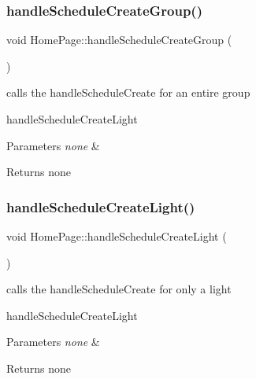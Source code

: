 \subsubsection{\texorpdfstring{handle\+Schedule\+Create\+Group()}{handleScheduleCreateGroup()}}
{\footnotesize\ttfamily void Home\+Page\+::handle\+Schedule\+Create\+Group (\begin{DoxyParamCaption}{ }\end{DoxyParamCaption})\hspace{0.3cm}{\ttfamily [private]}}



calls the handle\+Schedule\+Create for an entire group 

handle\+Schedule\+Create\+Light 
\begin{DoxyParams}{Parameters}
{\em none} & \\
\hline
\end{DoxyParams}
\begin{DoxyReturn}{Returns}
none 
\end{DoxyReturn}
\mbox{\label{class_home_page_a90f36d7359af291e1becf350c7805768}} 
\subsubsection{\texorpdfstring{handle\+Schedule\+Create\+Light()}{handleScheduleCreateLight()}}
{\footnotesize\ttfamily void Home\+Page\+::handle\+Schedule\+Create\+Light (\begin{DoxyParamCaption}{ }\end{DoxyParamCaption})\hspace{0.3cm}{\ttfamily [private]}}



calls the handle\+Schedule\+Create for only a light 

handle\+Schedule\+Create\+Light 
\begin{DoxyParams}{Parameters}
{\em none} & \\
\hline
\end{DoxyParams}
\begin{DoxyReturn}{Returns}
none 
\end{DoxyReturn}
\mbox{\label{class_home_page_af449cf14bc9d0196e0cb4a4c352b3919}} 
